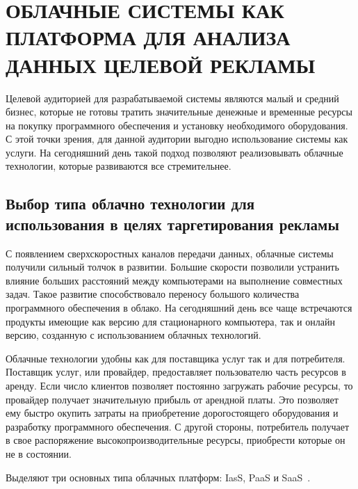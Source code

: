 \chapter{ОБЛАЧНЫЕ СИСТЕМЫ КАК ПЛАТФОРМА ДЛЯ АНАЛИЗА ДАННЫХ ЦЕЛЕВОЙ РЕКЛАМЫ}

Целевой аудиторией для разрабатываемой системы являются малый и средний бизнес, которые не готовы тратить значительные денежные и временные ресурсы на покупку программного обеспечения и установку необходимого оборудования. С этой точки зрения, для данной аудитории выгодно использование системы как услуги. На сегодняшний день такой подход позволяют реализовывать облачные технологии, которые развиваются все стремительнее.

\section{Выбор типа облачно технологии для использования в целях таргетирования рекламы}

С появлением сверхскоростных каналов передачи данных, облачные системы получили сильный толчок в развитии. Большие скорости позволили устранить влияние больших расстояний между компьютерами на выполнение совместных задач. Такое развитие способствовало переносу большого количества программного обеспечения в облако. На сегодняшний день все чаще встречаются продукты имеющие как версию для стационарного компьютера, так и онлайн версию, созданную с использованием облачных технологий.

Облачные технологии удобны как для поставщика услуг так и для потребителя. Поставщик услуг, или провайдер, предоставляет пользователю часть ресурсов в аренду. Если число клиентов позволяет постоянно загружать рабочие ресурсы, то провайдер получает значительную прибыль от арендной платы. Это позволяет ему быстро окупить затраты на приобретение дорогостоящего оборудования и разработку программного обеспечения.
С другой стороны, потребитель получает в свое распоряжение высокопроизводительные ресурсы, приобрести которые он не в состоянии. 

Выделяют три основных типа облачных платформ: IasS, PaaS и SaaS~\cite{sareen2013cloud}.

